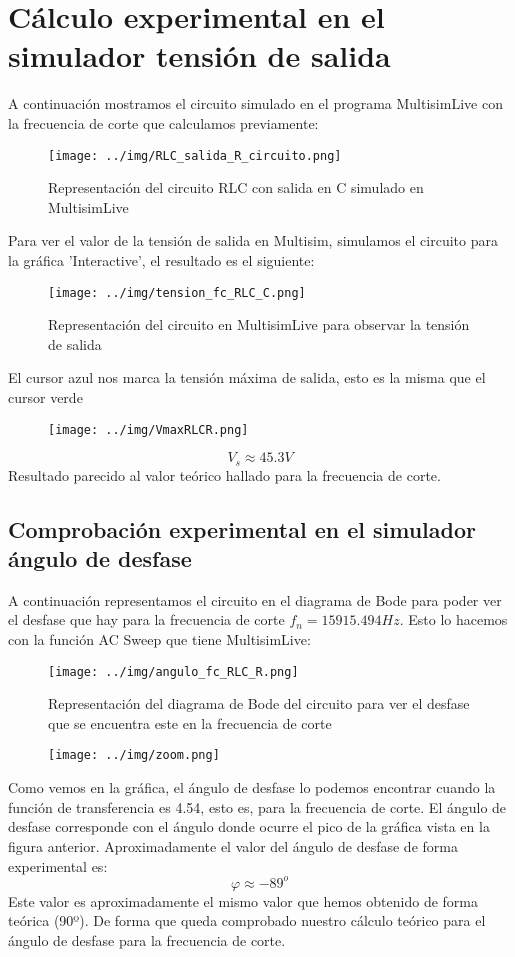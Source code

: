 \documentclass[11pt,letterpaper]{article}
\begin{document}
\section{Cálculo experimental en el simulador tensión de salida}
A continuación mostramos el circuito simulado en el programa MultisimLive con la frecuencia de corte que calculamos previamente:
\begin{figure}[H]
	\centering
	\texttt{[image: ../img/RLC\_salida\_R\_circuito.png]}
	\caption{Representación del circuito RLC con salida en C simulado en MultisimLive}
	\label{fig:img-RLC_salida_L-png}
\end{figure}
Para ver el valor de la tensión de salida en Multisim, simulamos el circuito para la gráfica 'Interactive', el resultado es el siguiente:
\begin{figure}[H]
	\centering
	\texttt{[image: ../img/tension\_fc\_RLC\_C.png]}
	\caption{Representación del circuito en MultisimLive para observar la tensión de salida }
	\label{fig:}
\end{figure}
El cursor azul nos marca la tensión máxima de salida, esto es la misma que el cursor verde
\begin{figure}[H]
    \centering
    \texttt{[image: ../img/VmaxRLCR.png]}
\end{figure}
\begin{equation}
	\boxed{V_s \approx  45.3 V}
\end{equation}
Resultado parecido al valor teórico hallado para la frecuencia de corte. 
\subsection{Comprobación experimental en el simulador ángulo de desfase}
A continuación representamos el circuito en el diagrama de Bode para poder ver el desfase que hay para la frecuencia de corte $f_n=15915.494 Hz$. Esto lo hacemos con la función AC Sweep que tiene MultisimLive:
\begin{figure}[H]
	\centering
	\texttt{[image: ../img/angulo\_fc\_RLC\_R.png]}
	\caption{Representación del diagrama de Bode del circuito para ver el desfase que se encuentra este en la frecuencia de corte}
	\label{fig:-img-angulo_fc-png}
\end{figure}
\begin{figure}[H]
    \centering
    \texttt{[image: ../img/zoom.png]}
    \label{fig:-img-zoom-png}
\end{figure}
Como vemos en la gráfica, el ángulo de desfase lo podemos encontrar cuando la función de transferencia es 4.54, esto es, para la frecuencia de corte. El ángulo de desfase corresponde con el ángulo donde ocurre el pico de la gráfica vista en la figura anterior. Aproximadamente el valor del ángulo de desfase de forma experimental es:
\begin{equation} 
	\boxed{\varphi \approx -89^o}
\end{equation}
Este valor es aproximadamente el mismo valor que hemos obtenido de forma teórica (90º). De forma que queda comprobado nuestro cálculo teórico para el ángulo de  desfase para la frecuencia de corte.
\end{document}
